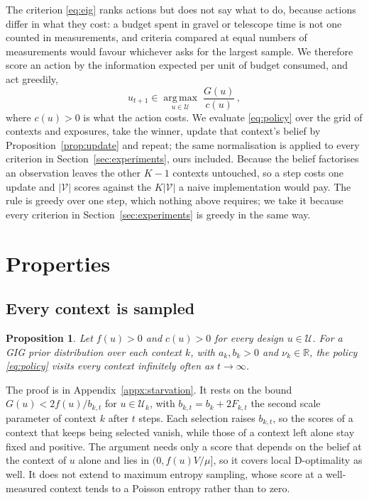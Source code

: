 \documentclass[twoside]{article}
\theoremstyle{plain}
\newtheorem{proposition}{Proposition}
\theoremstyle{definition}
\theoremstyle{remark}
\begin{document}
The criterion \eqref{eq:eig} ranks actions but does not say what to do, because actions differ in what they cost: a budget spent in gravel or telescope time is not one counted in measurements, and criteria compared at equal numbers of measurements would favour whichever asks for the largest sample.
We therefore score an action by the information expected per unit of budget consumed, and act greedily,
%
\begin{equation}
    u_{t + 1} \in \operatorname*{arg\,max}_{u \in \mathcal{U}} \; \frac{G(u)}{c(u)} \,,
    \label{eq:policy}
\end{equation}
%
where $c(u) > 0$ is what the action costs.
We evaluate \eqref{eq:policy} over the grid of contexts and exposures, take the winner, update that context's belief by Proposition~\ref{prop:update} and repeat; the same normalisation is applied to every criterion in Section~\ref{sec:experiments}, ours included.
Because the belief factorises an observation leaves the other $K - 1$ contexts untouched, so a step costs one update and $|\mathcal{V}|$ scores against the $K |\mathcal{V}|$ a naive implementation would pay.
The rule is greedy over one step, which nothing above requires; we take it because every criterion in Section~\ref{sec:experiments} is greedy in the same way.

\section{Properties}
\label{sec:properties}

\subsection{Every context is sampled}
\label{sec:properties_coverage}

\begin{proposition} 
    \label{prop:starvation}
    Let $f(u) > 0$ and $c(u) > 0$ for every design $u \in \mathcal{U}$. For a GIG prior distribution over each context $k$, with $a_k, b_k > 0$ and $\nu_k \in \mathbb{R}$, the policy \eqref{eq:policy} visits every context infinitely often as $t \rightarrow \infty$.
\end{proposition}

The proof is in Appendix~\ref{appx:starvation}.
It rests on the bound $G(u) < 2 f(u) / b_{k,t}$ for $u \in \mathcal{U}_k$, with $b_{k,t} = b_k + 2 F_{k,t}$ the second scale parameter of context $k$ after $t$ steps.
Each selection raises $b_{k,t}$, so the scores of a context that keeps being selected vanish, while those of a context left alone stay fixed and positive.
The argument needs only a score that depends on the belief at the context of $u$ alone and lies in $(0, f(u) V / \mu]$, so it covers local D-optimality as well.
It does not extend to maximum entropy sampling, whose score at a well-measured context tends to a Poisson entropy rather than to zero.
\end{document}
